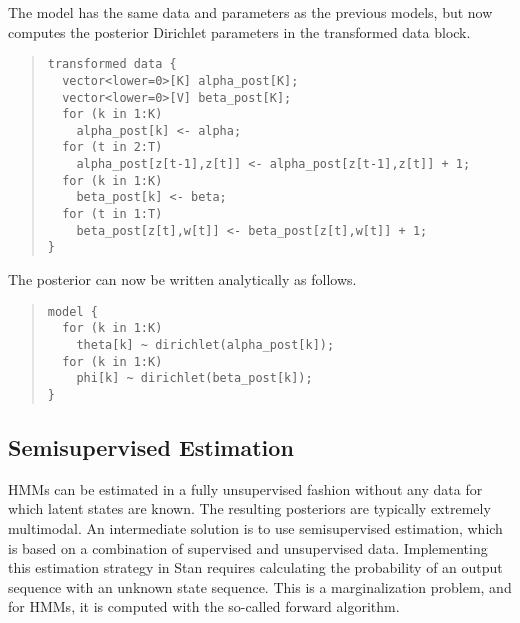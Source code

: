The model has the same data and parameters as the previous models, but
now computes the posterior Dirichlet parameters in the transformed
data block.
%
\begin{quote}
\begin{Verbatim}[fontsize=\small]
transformed data {
  vector<lower=0>[K] alpha_post[K];
  vector<lower=0>[V] beta_post[K];
  for (k in 1:K) 
    alpha_post[k] <- alpha;
  for (t in 2:T)
    alpha_post[z[t-1],z[t]] <- alpha_post[z[t-1],z[t]] + 1;
  for (k in 1:K)
    beta_post[k] <- beta;
  for (t in 1:T)
    beta_post[z[t],w[t]] <- beta_post[z[t],w[t]] + 1;
}
\end{Verbatim}
\end{quote}
%
The posterior can now be written analytically as follows.
%
\begin{quote}
\begin{Verbatim}[fontsize=\small]
model {
  for (k in 1:K) 
    theta[k] ~ dirichlet(alpha_post[k]);
  for (k in 1:K)
    phi[k] ~ dirichlet(beta_post[k]);
}
\end{Verbatim}
\end{quote}


\subsection{Semisupervised Estimation}

HMMs can be estimated in a fully unsupervised fashion without any data
for which latent states are known.  The resulting posteriors are
typically extremely multimodal.  An intermediate solution is to use
semisupervised estimation, which is based on a combination of
supervised and unsupervised data.  Implementing this estimation
strategy in Stan requires calculating the probability of an output
sequence with an unknown state sequence.  This is a marginalization
problem, and for HMMs, it is computed with the so-called forward
algorithm.  

